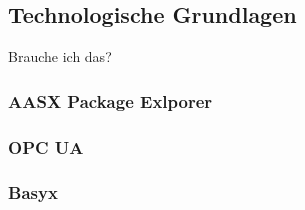 \subsection{Technologische Grundlagen}
Brauche ich das?
\subsubsection{AASX Package Exlporer}
\subsubsection{OPC UA}
\subsubsection{Basyx}